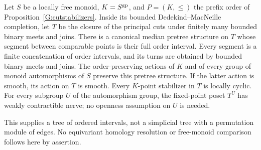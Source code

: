 \begin{proposition}
\label{G:prefixtree}
Let $S$ be a locally free monoid, $K=S^{\mathrm{gp}}$, and $P=(K,\le)$
the prefix order of Proposition~\ref{G:cutstabilizers}. Inside its
bounded Dedekind--MacNeille completion, let $T$ be the closure of
the principal cuts under finitely many bounded binary meets and
joins. There is a canonical median pretree structure on $T$ whose
segment between comparable points is their full order interval.
Every segment is a finite concatenation of order intervals, and
its turns are obtained by bounded binary meets and joins.
The order-preserving actions of $K$ and of every group of monoid
automorphisms of $S$ preserve this pretree structure. If the latter
action is smooth, its action on $T$ is smooth. Every $K$-point
stabilizer in $T$ is locally cyclic. For every subgroup $U$ of the
automorphism group, the fixed-point poset $T^U$ has weakly
contractible nerve; no openness assumption on $U$ is needed.

This supplies a tree of ordered intervals, not a simplicial tree
with a permutation module of edges. No equivariant homology
resolution or free-monoid comparison follows here by assertion.
\end{proposition}
